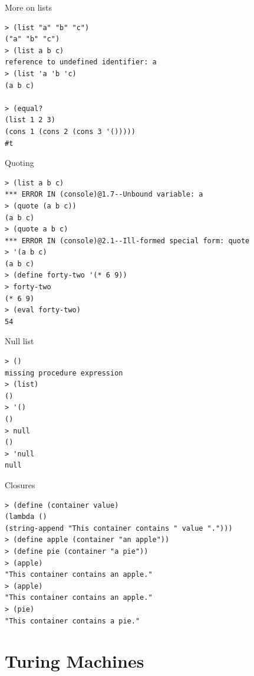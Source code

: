 \begin{frame}[fragile]{More on lists}
\begin{verbatim}
> (list "a" "b" "c")
("a" "b" "c")
> (list a b c)
reference to undefined identifier: a
> (list 'a 'b 'c)
(a b c)

> (equal? 
(list 1 2 3)
(cons 1 (cons 2 (cons 3 '()))))
#t
\end{verbatim}
\end{frame}

\begin{frame}[fragile]{Quoting}
\begin{verbatim}
> (list a b c)
*** ERROR IN (console)@1.7--Unbound variable: a
> (quote (a b c))
(a b c)
> (quote a b c)
*** ERROR IN (console)@2.1--Ill-formed special form: quote
> '(a b c) 
(a b c)
> (define forty-two '(* 6 9))
> forty-two
(* 6 9)
> (eval forty-two)
54
\end{verbatim}
\end{frame}

\begin{frame}[fragile]{Null list}
\begin{verbatim}
> ()
missing procedure expression
> (list)
()
> '()
()
> null
()
> 'null
null
\end{verbatim}
\end{frame}

\begin{frame}[fragile]{Closures}
\begin{verbatim}
> (define (container value)
(lambda ()
(string-append "This container contains " value ".")))
> (define apple (container "an apple"))
> (define pie (container "a pie"))
> (apple)
"This container contains an apple."
> (apple)
"This container contains an apple."
> (pie)
"This container contains a pie."
\end{verbatim}
\end{frame}



\section{Turing Machines}


